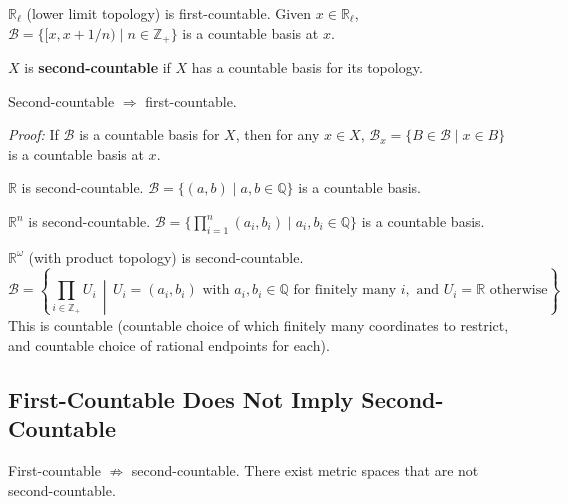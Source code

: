 \documentclass[11pt]{report}
\begin{document}
\begin{exbox}
$\mathbb{R}_\ell$ (lower limit topology) is first-countable. Given $x \in \mathbb{R}_\ell$, $\mathcal{B} = \{[x, x + 1/n) \mid n \in \mathbb{Z}_+\}$ is a countable basis at $x$.
\end{exbox}

\begin{defbox}
$X$ is \textbf{second-countable} if $X$ has a countable basis for its topology.
\end{defbox}

\begin{rembox}
Second-countable $\Rightarrow$ first-countable.

\textit{Proof:} If $\mathcal{B}$ is a countable basis for $X$, then for any $x \in X$, $\mathcal{B}_x = \{B \in \mathcal{B} \mid x \in B\}$ is a countable basis at $x$.
\end{rembox}

\begin{exbox}
$\mathbb{R}$ is second-countable. $\mathcal{B} = \{(a, b) \mid a, b \in \mathbb{Q}\}$ is a countable basis.
\end{exbox}

\begin{exbox}
$\mathbb{R}^n$ is second-countable. $\mathcal{B} = \{\prod_{i=1}^{n}(a_i, b_i) \mid a_i, b_i \in \mathbb{Q}\}$ is a countable basis.
\end{exbox}

\begin{exbox}
$\mathbb{R}^\omega$ (with product topology) is second-countable.
\[\mathcal{B} = \left\{\prod_{i \in \mathbb{Z}_+} U_i \,\middle|\, U_i = (a_i, b_i) \text{ with } a_i, b_i \in \mathbb{Q} \text{ for finitely many } i, \text{ and } U_i = \mathbb{R} \text{ otherwise}\right\}\]
This is countable (countable choice of which finitely many coordinates to restrict, and countable choice of rational endpoints for each).
\end{exbox}

\subsection{First-Countable Does Not Imply Second-Countable}

\begin{rembox}
First-countable $\not\Rightarrow$ second-countable. There exist metric spaces that are not second-countable.
\end{rembox}
\end{document}
